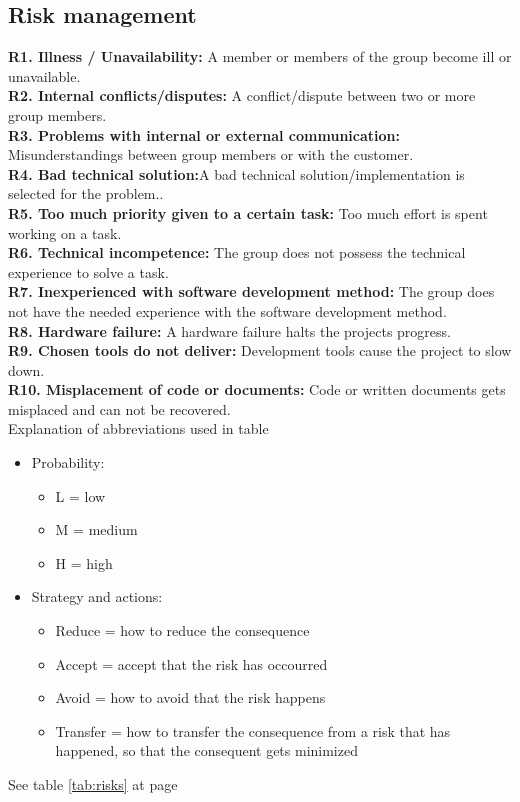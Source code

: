 

\subsection{Risk management}

\textbf{R1. Illness / Unavailability:} A member or members of the group become ill or unavailable. \\
\textbf{R2. Internal conflicts/disputes:} A conflict/dispute between two or more group members. \\
\textbf{R3. Problems with internal or external communication:} Misunderstandings between group members or with the customer. \\
\textbf{R4. Bad technical solution:}A bad technical solution/implementation is selected for the problem.. \\
\textbf{R5. Too much priority given to a certain task:} Too much effort is spent working on a task. \\
\textbf{R6. Technical incompetence:} The group does not possess the technical experience to solve a task. \\
\textbf{R7. Inexperienced with software development method:} The group does not have the needed experience with the software development method. \\
\textbf{R8. Hardware failure:} A hardware failure halts the projects progress. \\
\textbf{R9. Chosen tools do not deliver:} Development tools cause the project to slow down. \\
\textbf{R10. Misplacement of code or documents:} Code or written documents gets misplaced and can not be recovered. \\

Explanation of abbreviations used in table%
\begin{itemize}
\item{}Probability:
\begin{itemize}
\item{}L = low
\item{}M = medium
\item{}H = high
\end{itemize}
\item{}Strategy and actions:
\begin{itemize}
\item{}Reduce = how to reduce the consequence
\item{}Accept = accept that the risk has occourred
\item{}Avoid = how to avoid that the risk happens
\item{}Transfer = how to transfer the consequence from a risk that has happened, so that the consequent gets minimized
\end{itemize}
\end{itemize}

See table \ref{tab:risks} at page \pageref{tab:risks}







